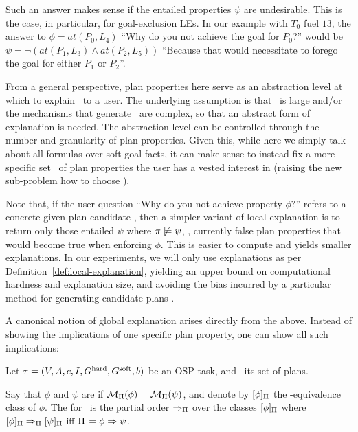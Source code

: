 Such an answer makes sense if the entailed properties $\psi$ are
undesirable. This is the case, in particular, for goal-exclusion
LEs. In our example with $T_0$ fuel $13$, the answer to $\phi =
at(P_0,L_4)$ ``Why do you not achieve the goal for $P_0$?'' would be
$\psi = \neg (at(P_1,L_3) \wedge at(P_2,L_5))$ ``Because that would
necessitate to forego the goal for either $P_1$ or $P_2$''.

From a general perspective, plan properties here serve as an
abstraction level at which to explain \plans\ to a user. The
underlying assumption is that \plans\ is large and/or the mechanisms
that generate \plans\ are complex, so that an abstract form of
explanation is needed. The abstraction level can be controlled through
the number and granularity of plan properties. Given this, while here
we simply talk about all formulas over soft-goal facts, it can make
sense to instead fix a more specific set \props\ of plan properties
the user has a vested interest in (raising the new sub-problem how to
choose \props).

Note that, if the user question ``Why do you not achieve property
$\phi$?''  refers to a concrete given plan candidate \plan, then a
simpler variant of local explanation is to return only those entailed
$\psi$ where $\pi \not\models \psi$, \ie, currently false plan
properties that would become true when enforcing $\phi$. This is
easier to compute and yields smaller explanations. In our experiments,
we will only use explanations as per
Definition~\ref{def:local-explanation}, yielding an upper bound on
computational hardness and explanation size, and avoiding the bias
incurred by a particular method for generating candidate plans \plan.

A canonical notion of global explanation arises directly from the
above.  Instead of showing the implications of one specific plan
property, one can show all such implications:

\begin{definition}
Let $\tau =
(V,\allowbreak A,\allowbreak{\ensuremath{c}},\allowbreak I,\allowbreak G^{\text{\textup{hard}}},\allowbreak G^{\text{\textup{soft}}},\allowbreak{\ensuremath{b}})$
be an OSP task, and \plans\ its set of plans.

Say that $\phi$ and $\psi$ are  if
${\cal M}_{\Pi}(\phi) = {\cal M}_{\Pi}(\psi)$, and denote by
$[\phi]_{\Pi}$ the \plans-equivalence class of $\phi$.
%
The  for \task\ is the partial order
$\Rightarrow_{\Pi}$ over the classes $[\phi]_{\Pi}$ where
$[\phi]_{\Pi} \Rightarrow_{\Pi} [\psi]_{\Pi}$ iff
$\Pi \models \phi \Rightarrow \psi$.
%
\end{definition}

